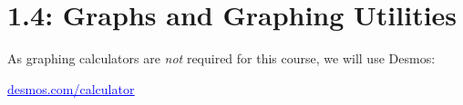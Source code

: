 \documentclass[../mathNotesPreamble]{subfiles}
\begin{document}
  \section{1.4: Graphs and Graphing Utilities}
  As graphing calculators are \emph{not} required for this course, we will use Desmos:
  \begin{center}
    \href{https://www.desmos.com/calculator}{\textcolor{blue}{\underline{desmos.com/calculator}}}
  \end{center}
  \pagebreak
\end{document}

